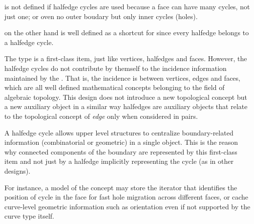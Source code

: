 { is not defined if halfedge cycles  are used because a face
can have many cycles, not just one; or oven no outer boudary but only inner cycles (holes).

 on the other hand is well defined as a shortcut for 
since every halfedge belongs to a halfedge cycle.

The type  is a first-class  item, just like vertices, halfedges and faces.
However, the halfedge cycles do not contribute  by themself to the incidence information 
maintained by the . That is, the incidence is between vertices, edges and faces,
which are all well defined mathematical concepts belonging to the field of algebraic topology.
This design does not introduce a new topological concept but a new
auxiliary object in a similar way halfedges are auxiliary objects that 
relate to the topological concept of {\em edge} only when considered in pairs.

A halfedge cycle allows upper level structures to centralize boundary-related information
(combinatorial or geometric) in a single object. This is the reason why 
connected components of the boundary are represented by this first-class  item 
and not just by a halfedge implicitly representing the cycle (as in other designs).

For instance, a model of the  concept  may store the iterator that identifies the position of
cycle in the face for fast hole migration across different faces, or cache curve-level geometric
information such as orientation even if not supported by the curve type itself.
}

